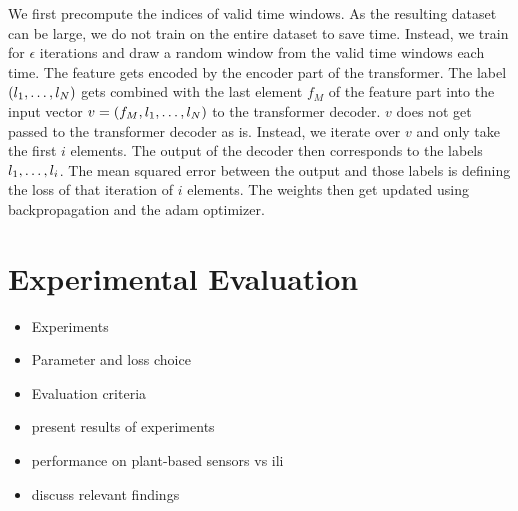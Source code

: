 \documentclass[11pt,a4paper]{article}
\begin{document}
We first precompute the indices of valid time windows.
As the resulting dataset can be large, we do not train on the entire dataset to save time.
Instead, we train for $\epsilon$ iterations and draw a random window from the valid time windows each time.
The feature gets encoded by the encoder part of the transformer.
The label $(l_1,\mathellipsis,l_N)$ gets combined with the last element $f_M$ of the feature part into the input vector $v = (f_M,l_1,\mathellipsis,l_N)$ to the transformer decoder.
$v$ does not get passed to the transformer decoder as is. 
Instead, we iterate over $v$ and only take the first $i$ elements.
The output of the decoder then corresponds to the labels $l_1,\mathellipsis,l_{i}$.
The mean squared error between the output and those labels is defining the loss of that iteration of $i$ elements.
The weights then get updated using backpropagation and the adam optimizer. %

\section{Experimental Evaluation}

\begin{itemize}
\item Experiments
\item Parameter and loss choice
\item Evaluation criteria
    \item present results of experiments
    \item performance on plant-based sensors vs ili
    \item discuss relevant findings
\end{itemize}
\end{document}
